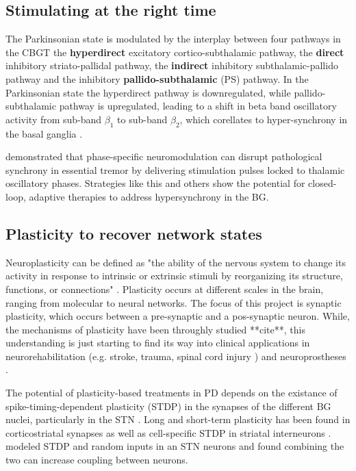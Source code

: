 \subsection{Stimulating at the right time}
The Parkinsonian state is modulated by the interplay between four pathways in the CBGT
the \textbf{hyperdirect} excitatory cortico-subthalamic pathway,
the \textbf{direct} inhibitory striato-pallidal pathway,
the \textbf{indirect} inhibitory subthalamic-pallido pathway and
the inhibitory \textbf{pallido-subthalamic} (PS) pathway. In the Parkinsonian state the hyperdirect
pathway is downregulated, while pallido-subthalamic pathway is upregulated, leading to a shift in
beta band oscillatory activity from sub-band $\beta_1$ to sub-band $\beta_2$, which corellates to
hyper-synchrony in the basal ganglia \cite{west2022stimulating}.

\cite{cagnan2017stimulating} demonstrated that phase-specific neuromodulation can disrupt pathological
synchrony in essential tremor by delivering stimulation pulses locked to thalamic oscillatory phases.
Strategies like this and others \cite{beudel2018adaptive} show the potential for closed-loop,
adaptive therapies to address hypersynchrony in the BG.

\subsection{Plasticity to recover network states}
Neuroplasticity can be defined as "the ability of the nervous system to change its activity in
response to intrinsic or extrinsic stimuli by reorganizing its structure, functions, or
connections" \cite{mateos2019impact}.
Plasticity occurs at different scales in the brain, ranging from molecular to neural networks.
The focus of this project is synaptic plasticity, which occurs between a pre-synaptic and a
pos-synaptic neuron. While, the mechanisms of plasticity have been throughly studied **cite**,
this understanding is just starting to find its way into clinical applications in
neurorehabilitation (e.g. stroke, trauma, spinal cord injury \cite{cramer2011harnessing}) and
neuroprostheses \cite{lebedev2017brain}.

The potential of plasticity-based treatments in PD depends on the existance of
spike-timing-dependent plasticity (STDP) in the synapses of the different BG nuclei, particularly
in the STN \cite{rubin2012basal}. Long and short-term plasticity has been found in
corticostriatal synapses \cite{kreitzer2008striatal, di2009short} as well as cell-specific STDP in
striatal interneurons \cite{fino2010spike}.
\cite{thieu2024role} modeled STDP and random inputs in an STN neurons and found combining the two can
increase coupling between neurons.

